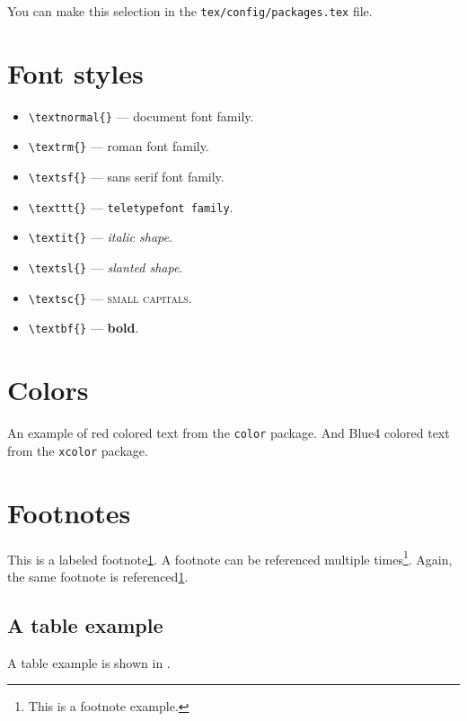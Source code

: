 You can make this selection in the \verb+tex/config/packages.tex+ file.


\section{Font styles}
\label{c2:s:font-styles}

\begin{itemize}
\item
\verb+\textnormal{}+ --- \textnormal{document font family}.
\item
\verb+\textrm{}+ --- \textrm{roman font family}.
\item
\verb+\textsf{}+ --- \textsf{sans serif font family}.
\item
\verb+\texttt{}+ --- \texttt{teletypefont family}.
\item
\verb+\textit{}+ --- \textit{italic shape}.
\item
\verb+\textsl{}+ --- \textsl{slanted shape}.
\item
\verb+\textsc{}+ --- \textsc{small capitals}.
\item
\verb+\textbf{}+ --- \textbf{bold}.
\end{itemize}


\section{Colors}
\label{c2:s:colors}

An example of {\color{red} red colored text} from the \texttt{color} package.
And {\color{Blue4} Blue4 colored text} from the \texttt{xcolor} package.

\section{Footnotes}
\label{c2:s:footnotes}

This is a labeled footnote\cref{foot:example}.
A footnote can be referenced multiple times\footnote{\label{foot:example}This is a footnote example.}.
Again, the same footnote is referenced\cref{foot:example}.


\subsection{A table example}
\label{c2:ss:a-table-example}

A table example is shown in .




